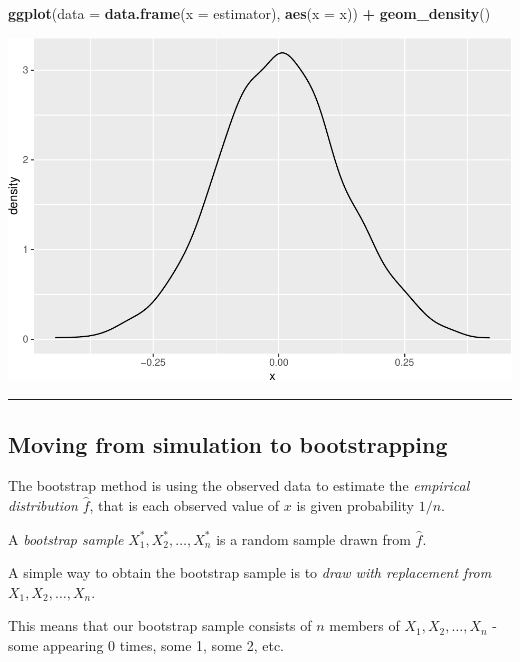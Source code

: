 \documentclass[]{article}
\newenvironment{Shaded}{\begin{snugshade}}{\end{snugshade}}
\newcommand{\DataTypeTok}[1]{\textcolor[rgb]{0.13,0.29,0.53}{#1}}
\newcommand{\KeywordTok}[1]{\textcolor[rgb]{0.13,0.29,0.53}{\textbf{#1}}}
\newcommand{\NormalTok}[1]{#1}
\newcommand{\OperatorTok}[1]{\textcolor[rgb]{0.81,0.36,0.00}{\textbf{#1}}}
\newcommand{\StringTok}[1]{\textcolor[rgb]{0.31,0.60,0.02}{#1}}
\begin{document}
\begin{Shaded}
\begin{Highlighting}[]
\KeywordTok{ggplot}\NormalTok{(}\DataTypeTok{data =} \KeywordTok{data.frame}\NormalTok{(}\DataTypeTok{x =}\NormalTok{ estimator), }\KeywordTok{aes}\NormalTok{(}\DataTypeTok{x =}\NormalTok{ x)) }\OperatorTok{+}\StringTok{ }\KeywordTok{geom_density}\NormalTok{()}
\end{Highlighting}
\end{Shaded}

\includegraphics{5Resample_files/figure-latex/unnamed-chunk-10-1.pdf}

\begin{center}\rule{0.5\linewidth}{\linethickness}\end{center}

\hypertarget{moving-from-simulation-to-bootstrapping}{%
\subsection{Moving from simulation to
bootstrapping}\label{moving-from-simulation-to-bootstrapping}}

The bootstrap method is using the observed data to estimate the
\emph{empirical distribution} \(\hat{f}\), that is each observed value
of \(x\) is given probability \(1/n\).

A \emph{bootstrap sample} \(X^*_1,X^*_2,\ldots, X^*_n\) is a random
sample drawn from \(\hat{f}\).

A simple way to obtain the bootstrap sample is to \emph{draw with
replacement from \(X_1, X_2, \ldots, X_n\)}.

This means that our bootstrap sample consists of \(n\) members of
\(X_1, X_2, \ldots, X_n\) - some appearing 0 times, some 1, some 2, etc.
\end{document}
